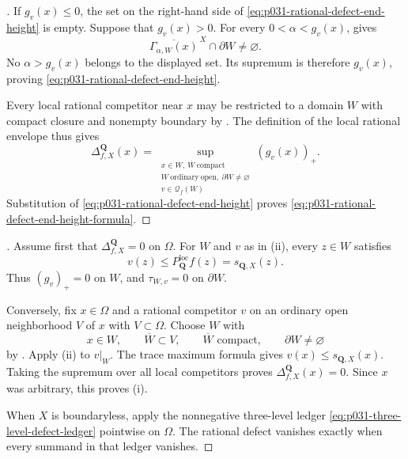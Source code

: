 \begin{proof}[]
If $g_v(x)\leq0$, the set on the right-hand side of
\eqref{eq:p031-rational-defect-end-height} is empty.  Suppose that
$g_v(x)>0$.  For every $0<\alpha<g_v(x)$,
 gives
\[
      \overline{\Gamma_{\alpha,W}(x)}^{\,X}
                         \cap\partial W\ne\varnothing.
\]
No $\alpha>g_v(x)$ belongs to the displayed set.  Its supremum is
therefore $g_v(x)$, proving
\eqref{eq:p031-rational-defect-end-height}.

Every local rational competitor near $x$ may be restricted to a domain
$W$ with compact closure and nonempty boundary by
.  The definition of the
local rational envelope thus gives
\[
 \Delta^{\mathbf Q}_{f,X}(x)
  =\sup_{\substack{x\in W,\ \overline W\ \mathrm{compact}\\
                   W\ \mathrm{ordinary\ open},\ \partial W\ne\varnothing\\
                   v\in\mathcal Q_f(W)}}(g_v(x))_+.
\]
Substitution of
\eqref{eq:p031-rational-defect-end-height} proves
\eqref{eq:p031-rational-defect-end-height-formula}.
\end{proof}

\begin{proof}[]
Assume first that $\Delta^{\mathbf Q}_{f,X}=0$ on $\Omega$.  For
$W$ and $v$ as in \textup{(ii)}, every $z\in W$ satisfies
\[
 v(z)\leq P_{\mathbf Q}^{\mathrm{loc}}f(z)
        =s_{\mathbf Q,X}(z).
\]
Thus $(g_v)_+=0$ on $W$, and
$\tau_{W,v}=0$ on $\partial W$.

Conversely, fix $x\in\Omega$ and a rational competitor $v$ on an ordinary
open neighborhood $V$ of $x$ with $V\subset\Omega$.  Choose $W$ with
\[
 x\in W,\qquad \overline W\subset V,\qquad
 \overline W\text{ compact},\qquad \partial W\ne\varnothing
\]
by .  Apply \textup{(ii)}
to $v|_W$.  The trace maximum formula gives
$v(x)\leq s_{\mathbf Q,X}(x)$.  Taking the supremum over all local
competitors proves
$\Delta^{\mathbf Q}_{f,X}(x)=0$.  Since $x$ was arbitrary, this proves
\textup{(i)}.

When $X$ is boundaryless, apply the nonnegative three-level ledger
\eqref{eq:p031-three-level-defect-ledger} pointwise on $\Omega$.  The
rational defect vanishes exactly when every summand in that ledger
vanishes.
\end{proof}

